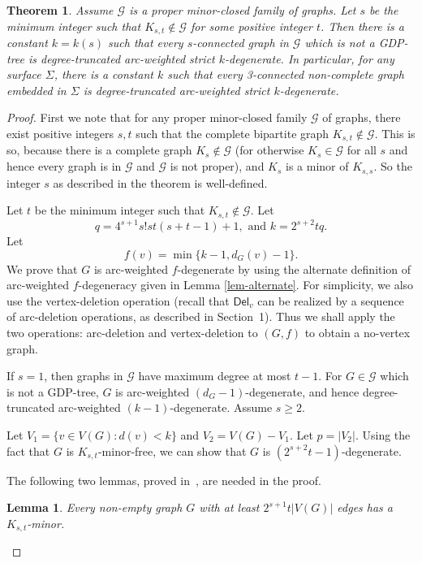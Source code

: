 \documentclass[11pt,a4paper]{article}
\newtheorem{theorem}{Theorem}
\newtheorem{lem}{Lemma}
\theoremstyle{definition}
\newcommand{\dd}{\textsf{Del}}
\begin{document}
\begin{theorem}
    \label{thm-minor}
    Assume $\mathcal{G}$ is a proper minor-closed family of graphs. Let $s$ be the minimum integer such that $K_{s,t} \notin \mathcal{G}$ for some positive integer $t$. Then there is a constant $k=k(s)$ such that every $s$-connected graph in $\mathcal{G}$ which is not a GDP-tree is degree-truncated arc-weighted strict $k$-degenerate.
    In particular, for any surface $\Sigma$, there is a constant $k$ such that every 3-connected non-complete graph embedded in $\Sigma$ is degree-truncated arc-weighted strict $k$-degenerate.
\end{theorem}
 \begin{proof}

First we note that for any proper minor-closed family $\mathcal{G}$ of graphs, there exist positive integers $s,t$ such that the complete bipartite graph $K_{s,t} \notin \mathcal{G}$. This is so, because there is a complete graph $K_s \notin \mathcal{G}$ (for otherwise   $K_s \in \mathcal{G}$ for all $s$ and hence every graph is in $\mathcal{G}$ and $\mathcal{G}$ is not proper), and $K_s$ is a minor of $K_{s,s}$. So the integer $s$ as described in the theorem is well-defined. 

Let $t$ be the minimum integer such that $K_{s,t} \notin \mathcal{G}$. 
Let $$q = 4^{s+1}s! st (s+t-1)+1, \text{ and }  k=2^{s+2}tq.$$  Let $$f(v)=\min \{k-1, d_G(v)-1\}.$$
We prove that $G$ is arc-weighted  $f$-degenerate by using
the alternate definition of 
arc-weighted $f$-degeneracy given in Lemma \ref{lem-alternate}. For simplicity, we also use the vertex-deletion operation (recall that $\dd_v$ can be realized by a sequence of arc-deletion operations, as described in Section~1). Thus we shall apply the two operations: arc-deletion and vertex-deletion to $(G,f)$ to obtain a no-vertex graph.


If $s=1$, then graphs in $\mathcal{G}$ have maximum degree at most $t-1$.  For $G \in \mathcal{G}$ which is not a GDP-tree, $G$ is arc-weighted  $(d_{G}-1)$-degenerate, and hence degree-truncated arc-weighted $(k-1)$-degenerate. Assume $s \ge 2$.

Let $V_1 = \{v \in V(G): d(v) < k\}$ and $V_2 =V(G)-V_1$. Let $p=|V_2|$. Using the fact that $G$ is $K_{s,t}$-minor-free,  we can show that $G$ is $(2^{s+2}t-1)$-degenerate.

The following two lemmas, proved in~\cite{Thomason07}, are needed
in the proof.

\begin{lem}
	\label{lem-1b} Every non-empty graph $G$ with at least $2^{s+1}t|V(G)|$ edges has a $K_{s,t}$-minor.
\end{lem}	 


\end{proof}
\end{document}
